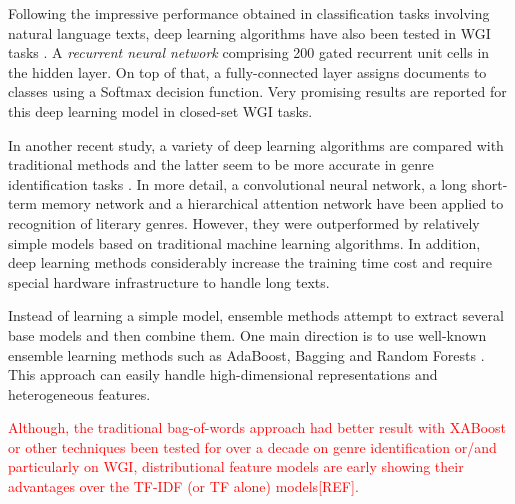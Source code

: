 Following the impressive performance obtained in classification tasks involving natural language texts, deep learning algorithms have also been tested in WGI tasks \parencite{strobel2018text}. A \textit{recurrent neural network} comprising 200 gated recurrent unit cells in the hidden layer. On top of that, a fully-connected layer assigns documents to classes using a Softmax decision function. Very promising results are reported for this deep learning model in closed-set WGI tasks. 

In another recent study, a variety of deep learning algorithms are compared with traditional methods and the latter seem to be more accurate in genre identification tasks \parencite{worsham2018genre}. In more detail, a convolutional neural network, a long short-term memory network and a hierarchical attention network have been applied to recognition of literary genres. However, they were outperformed by relatively simple models based on traditional machine learning algorithms. In addition, deep learning methods considerably increase the training time cost and require special hardware infrastructure to handle long texts.

Instead of learning a simple model, ensemble methods attempt to extract several base models and then combine them. One main direction is to use well-known ensemble learning methods such as AdaBoost, Bagging and Random Forests \parencite{sugiyanto2014term,onan2018ensemble,worsham2018genre}. This approach can easily handle high-dimensional representations and heterogeneous features.

\textcolor{red}{Although, the traditional bag-of-words approach had better result with XABoost or other techniques been tested for over a decade on genre identification or/and particularly on WGI, distributional feature models are early showing their advantages over the TF-IDF (or TF alone) models[REF].}


